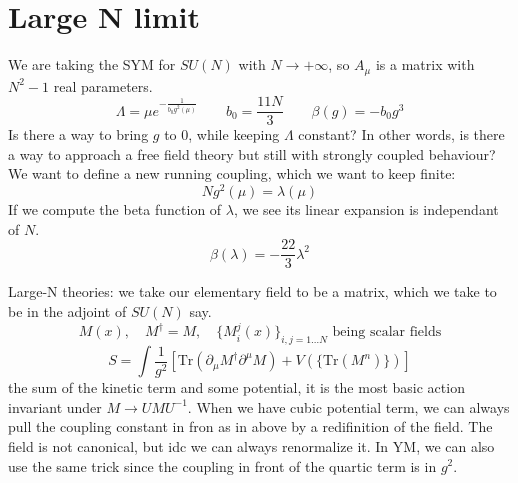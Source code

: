 \documentclass[a4paper]{book}
\theoremstyle{definition}
\theoremstyle{remark}
\begin{document}
\section{Large N limit} 

We are taking the SYM for $SU(N)$ with $N \rightarrow +\infty$, so $A_\mu$ is a matrix with $N^2-1$ real parameters. 
\begin{equation}
    \Lambda = \mu e^{-\frac{1}{b_0 g^2(\mu)}} \qquad b_0 = \frac{11N}{3} \qquad \beta(g) = -b_0 g^3
\end{equation}
Is there a way to bring $g$ to 0, while keeping $\Lambda$ constant? In other words, is there a way to approach a free field theory but still with strongly coupled behaviour? We want to define a new running coupling, which we want to keep finite:
\begin{equation}
    Ng^2(\mu) = \lambda(\mu)
\end{equation}
If we compute the beta function of $\lambda$, we see its linear expansion is independant of $N$. 
\begin{equation}
    \beta(\lambda) = -\frac{22}{3}\lambda^2
\end{equation}

Large-N theories: we take our elementary field to be a matrix, which we take to be in the adjoint of $SU(N)$ say. 
\begin{equation}
    M(x), \quad M^\dagger = M,\quad  \{M_i^j(x)\}_{i,j = 1\dots N} \text{ being scalar fields}
\end{equation}
\begin{equation}
    S = \int \frac{1}{g^2}\left[\text{Tr}(\partial_\mu M^\dagger \partial^\mu M) + V(\{\text{Tr}(M^n)\})\right]
\end{equation}
the sum of the kinetic term and some potential, it is the most basic action invariant under $M \rightarrow U M U^{-1}$. When we have cubic potential term, we can always pull the coupling constant in fron as in above by a redifinition of the field. The field is not canonical, but idc we can always renormalize it. In YM, we can also use the same trick since the coupling in front of the quartic term is in $g^2$. \par \medskip 
\end{document}
